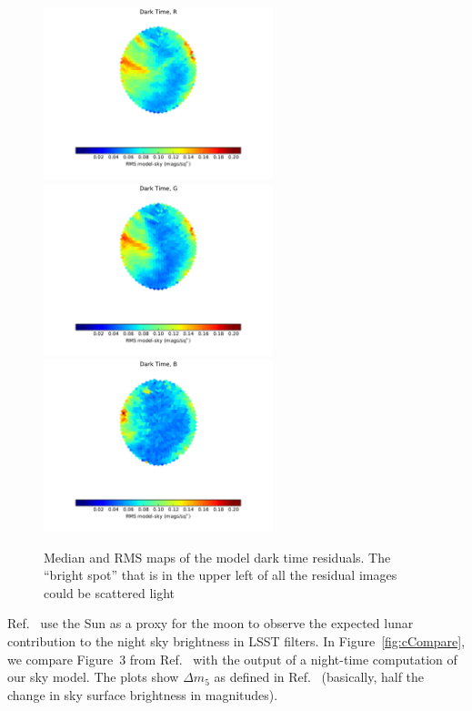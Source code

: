 \documentclass[]{spie}
\begin{document}
\begin{figure}[ht]
\begin{center}
  \includegraphics[height=5cm]{plots/stdResidMap_R.pdf}\includegraphics[height=5cm]{plots/stdResidMap_g.pdf}\includegraphics[height=5cm]{plots/stdResidMap_b.pdf}
  \end{center}
  \caption{Median and RMS maps of the model dark time residuals. The ``bright spot'' that is in the upper left of all the residual images could be scattered light }
\end{figure}


Ref.~ use the Sun as a proxy for the moon to observe the expected lunar contribution to the night sky brightness in LSST filters. In Figure~\ref{fig:cCompare}, we compare Figure~3 from Ref.~ with the output of a night-time computation of our sky model.  The plots show $\Delta m_5$ as defined in Ref.~ (basically, half the change in sky surface brightness in magnitudes).  
\end{document}
